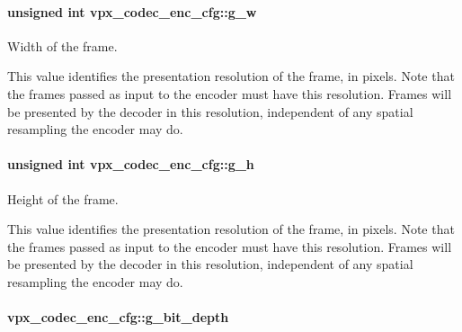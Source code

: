 \paragraph[{\texorpdfstring{g\+\_\+w}{g_w}}]{\setlength{\rightskip}{0pt plus 5cm}unsigned int vpx\+\_\+codec\+\_\+enc\+\_\+cfg\+::g\+\_\+w}\hypertarget{structvpx__codec__enc__cfg_a5c165f5b41ca1158f2883983a2b7709c}{}\label{structvpx__codec__enc__cfg_a5c165f5b41ca1158f2883983a2b7709c}


Width of the frame. 

This value identifies the presentation resolution of the frame, in pixels. Note that the frames passed as input to the encoder must have this resolution. Frames will be presented by the decoder in this resolution, independent of any spatial resampling the encoder may do. 
\paragraph[{\texorpdfstring{g\+\_\+h}{g_h}}]{\setlength{\rightskip}{0pt plus 5cm}unsigned int vpx\+\_\+codec\+\_\+enc\+\_\+cfg\+::g\+\_\+h}\hypertarget{structvpx__codec__enc__cfg_a4132bd89ce85bce7c08f2cc3b6f2b82e}{}\label{structvpx__codec__enc__cfg_a4132bd89ce85bce7c08f2cc3b6f2b82e}


Height of the frame. 

This value identifies the presentation resolution of the frame, in pixels. Note that the frames passed as input to the encoder must have this resolution. Frames will be presented by the decoder in this resolution, independent of any spatial resampling the encoder may do. 
\paragraph[{\texorpdfstring{g\+\_\+bit\+\_\+depth}{g_bit_depth}}]{ vpx\+\_\+codec\+\_\+enc\+\_\+cfg\+::g\+\_\+bit\+\_\+depth}\hypertarget{structvpx__codec__enc__cfg_aaaa7bca27fd42f24a2c215b247ba9190}{}\label{structvpx__codec__enc__cfg_aaaa7bca27fd42f24a2c215b247ba9190}


